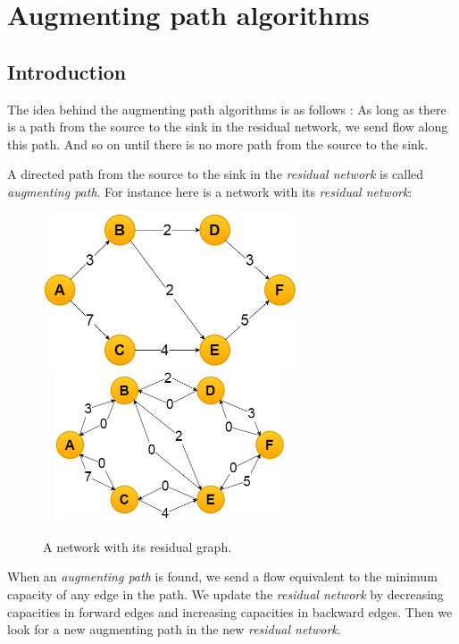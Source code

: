 \section{Augmenting path algorithms}
\subsection{Introduction}
The idea behind the augmenting path algorithms is as follows : 
As long as there is a path from the source to the sink in the residual network, we send flow along this path. And so on until there is no more path from the source to the sink.\newline

A directed path from the source to the sink in the \textit{residual network} is called \textit{augmenting path}. For instance here is a network with its \textit{residual network}: \newline

\begin{figure}[!h]
\includegraphics[width=7.5cm,height=4.5cm]{images/graph.png}\hfill
\includegraphics[width=7.5cm,height=4.5cm]{images/residualgraph.png}
\caption{A network with its residual graph.}
\end{figure}

When an \textit{augmenting path} is found, we send a flow equivalent to the minimum capacity of any edge in the path. We update the \textit{residual network} by decreasing capacities in forward edges and increasing capacities in backward edges. Then we look for a new augmenting path in the new \textit{residual network}. \newline

